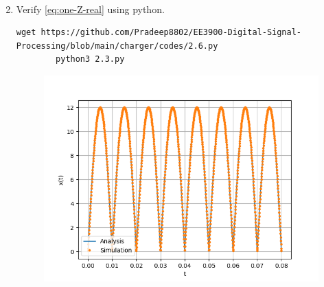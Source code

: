 \documentclass[journal,12pt,twocolumn]{IEEEtran}
\renewcommand\thesection{\arabic{section}}
\begin{document}
\begin{enumerate}[label=\thesection.\arabic*,ref=\thesection.\theenumi]
\begin{align}
    \end{align}
    \item Verify 
    \eqref{eq:one-Z-real}
    using python.\\
     \solution 
        \begin{lstlisting}
wget https://github.com/Pradeep8802/EE3900-Digital-Signal-Processing/blob/main/charger/codes/2.6.py
        python3 2.3.py
        \end{lstlisting}
          \begin{figure}[!ht]
			\centering
			\includegraphics[width=\columnwidth]{./figs/2.6.png}
			\caption{}
\end{figure}
    \end{enumerate}
\end{document}

